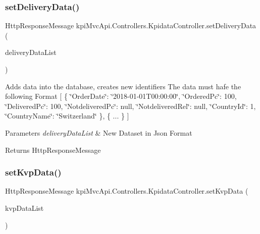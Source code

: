 \subsubsection{\texorpdfstring{set\+Delivery\+Data()}{setDeliveryData()}}
{\footnotesize\ttfamily Http\+Response\+Message kpi\+Mvc\+Api.\+Controllers.\+Kpidata\+Controller.\+set\+Delivery\+Data (\begin{DoxyParamCaption}\item[{List$<$ \hyperlink{classkpi_mvc_api_1_1_data_transfer_objects_1_1_delivery_data_dto}{Delivery\+Data\+Dto} $>$}]{delivery\+Data\+List }\end{DoxyParamCaption})\hspace{0.3cm}{\ttfamily [inline]}}



Adds data into the database, creates new identifiers The data must hafe the following Format \mbox{[} \{ \char`\"{}\+Order\+Date\char`\"{}\+: \char`\"{}2018-\/01-\/01\+T00\+:00\+:00\char`\"{}, \char`\"{}\+Ordered\+Pc\char`\"{}\+: 100, \char`\"{}\+Delivered\+Pc\char`\"{}\+: 100, \char`\"{}\+Notdelivered\+Pc\char`\"{}\+: null, \char`\"{}\+Notdelivered\+Rel\char`\"{}\+: null, \char`\"{}\+Country\+Id\char`\"{}\+: 1, \char`\"{}\+Country\+Name\char`\"{}\+: \char`\"{}\+Switzerland\char`\"{} \}, \{ ... \} \mbox{]} 


\begin{DoxyParams}{Parameters}
{\em delivery\+Data\+List} & New Dataset in Json Format \\
\hline
\end{DoxyParams}
\begin{DoxyReturn}{Returns}
{\ttfamily Http\+Response\+Message} 
\end{DoxyReturn}
\mbox{\label{classkpi_mvc_api_1_1_controllers_1_1_kpidata_controller_aaed21921287f9a780cc3ff7e1042dc2a}} 
\subsubsection{\texorpdfstring{set\+Kvp\+Data()}{setKvpData()}}
{\footnotesize\ttfamily Http\+Response\+Message kpi\+Mvc\+Api.\+Controllers.\+Kpidata\+Controller.\+set\+Kvp\+Data (\begin{DoxyParamCaption}\item[{List$<$ \hyperlink{classkpi_mvc_api_1_1_data_transfer_objects_1_1_kvp_data_dto}{Kvp\+Data\+Dto} $>$}]{kvp\+Data\+List }\end{DoxyParamCaption})\hspace{0.3cm}{\ttfamily [inline]}}



